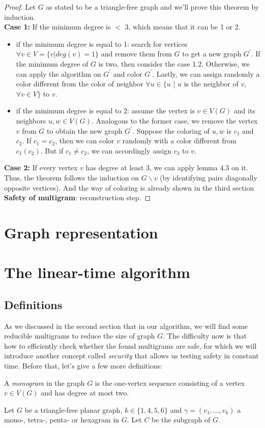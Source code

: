 \begin{proof}
Let $G$ as stated to be a triangle-free graph and we'll prove this theorem by induction.\\
\textbf{Case 1: } If the minimum degree is $<$ 3, which means that it can be 1 or 2.
\begin{itemize}
    \item if the minimum degree is equal to 1: search for vertices $\forall v \in V = \{v | deg(v) = 1\}$ and remove them from $G$ to get a new graph $G^{'}$. If the minimum degree of $G$ is two, then consider the case 1.2. Otherwise, we can apply the algorithm on $G^{'}$ and color $G^{'}$. Lastly, we can assign randomly a color different from the color of neighbor $\forall u \in \{u$ | $u$ is the neighbor of $v$, $\forall v \in V \}$ to $v$. 
    
    \item if the minimum degree is equal to 2: assume the vertex is $v \in V(G)$ and its neighbors $u, w \in V(G)$. Analogous to the former case, we remove the vertex $v$ from $G$ to obtain the new graph $G^{'}$. Suppose the coloring of $u, w$ is $c_1$ and $c_2$. If $c_1 = c_2$, then we can color $v$ randomly with a color different from $c_1(c_2)$. But if $c_1 \ne c_2$, we can accordingly assign $c_3$ to $v$. 
\end{itemize}
\textbf{Case 2:}  If every vertex $v$ has degree at least 3, we can apply lemma 4.3 on it. Thus, the theorem follows the induction on $G \backslash v$ (by identifying pairs diagonally opposite vertices). And the way of coloring is already shown in the third section \textbf{Safety of multigram}: reconstruction step. 

\end{proof}
\section{Graph representation}


\section{The linear-time algorithm}
\subsection{Definitions}
As we discussed in the second section that in our algorithm, we will find some reducible multigrams to reduce the size of graph $G$. The difficulty now is that how to efficiently check whether the found multigrams are safe, for which we will introduce another concept called \textit{security} that allows us testing safety in constant time. Before that, let's give a few more definitions:
\begin{definition}
A \textit{monogram} in the graph $G$ is the one-vertex sequence consisting of a vertex $v \in V(G)$ and has degree at most two. 
\end{definition}
Let $G$ be a triangle-free planar graph, $k \in \{1, 4, 5, 6\}$ and $\gamma = (v_1, ..., v_k)$ a mono-, tetra-, penta- or hexagram in $G$. Let $C$ be the subgraph of $G$.

